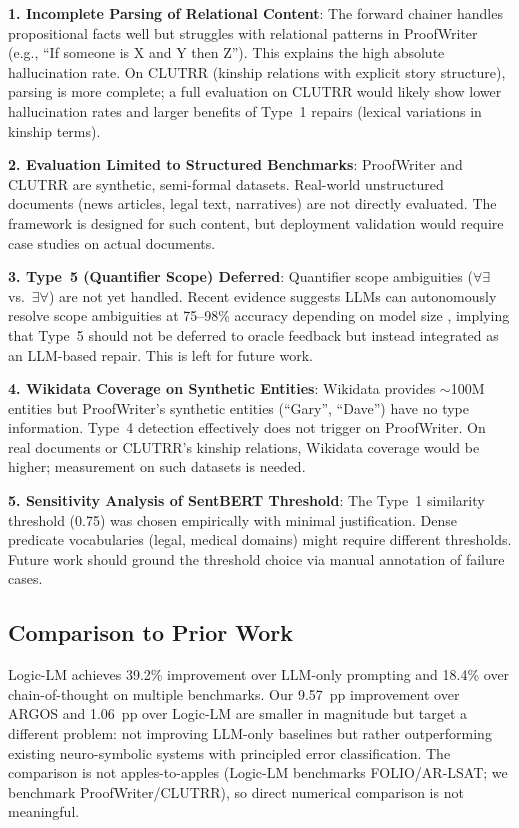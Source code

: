 \documentclass[11pt,letterpaper]{article}
\begin{document}
\textbf{1. Incomplete Parsing of Relational Content}: The forward chainer handles propositional facts well but struggles with relational patterns in ProofWriter (e.g., ``If someone is X and Y then Z''). This explains the high absolute hallucination rate. On CLUTRR (kinship relations with explicit story structure), parsing is more complete; a full evaluation on CLUTRR would likely show lower hallucination rates and larger benefits of Type~1 repairs (lexical variations in kinship terms).

\textbf{2. Evaluation Limited to Structured Benchmarks}: ProofWriter and CLUTRR are synthetic, semi-formal datasets. Real-world unstructured documents (news articles, legal text, narratives) are not directly evaluated. The framework is designed for such content, but deployment validation would require case studies on actual documents.

\textbf{3. Type~5 (Quantifier Scope) Deferred}: Quantifier scope ambiguities ($\forall\exists$ vs.\ $\exists\forall$) are not yet handled. Recent evidence suggests LLMs can autonomously resolve scope ambiguities at 75--98\% accuracy depending on model size \citep{Brassard2024}, implying that Type~5 should not be deferred to oracle feedback but instead integrated as an LLM-based repair. This is left for future work.

\textbf{4. Wikidata Coverage on Synthetic Entities}: Wikidata provides $\sim$100M entities but ProofWriter's synthetic entities (``Gary'', ``Dave'') have no type information. Type~4 detection effectively does not trigger on ProofWriter. On real documents or CLUTRR's kinship relations, Wikidata coverage would be higher; measurement on such datasets is needed.

\textbf{5. Sensitivity Analysis of SentBERT Threshold}: The Type~1 similarity threshold (0.75) was chosen empirically with minimal justification. Dense predicate vocabularies (legal, medical domains) might require different thresholds. Future work should ground the threshold choice via manual annotation of failure cases.

\subsection{Comparison to Prior Work}

Logic-LM \citep{Pan2023} achieves 39.2\% improvement over LLM-only prompting and 18.4\% over chain-of-thought on multiple benchmarks. Our 9.57~pp improvement over ARGOS and 1.06~pp over Logic-LM are smaller in magnitude but target a different problem: not improving LLM-only baselines but rather outperforming existing neuro-symbolic systems with principled error classification. The comparison is not apples-to-apples (Logic-LM benchmarks FOLIO/AR-LSAT; we benchmark ProofWriter/CLUTRR), so direct numerical comparison is not meaningful.
\end{document}
